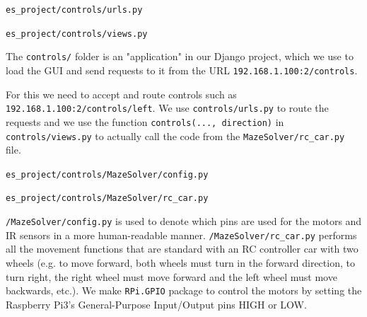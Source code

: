 \begin{description}[font=\quad $\circ$, topsep=6pt, itemsep=3em]
			
			
		\item \texttt{es\_project/controls/urls.py}
			
			
		\item \texttt{es\_project/controls/views.py}
			
			
			The \texttt{controls/} folder is an "application" in our Django project, which we use to load the GUI and send requests to it from the URL \texttt{192.168.1.100:2/controls}. 
			
			For this we need to accept and route controls such as \texttt{192.168.1.100:2/controls/left}. We use \texttt{controls/urls.py} to route the requests and we use the function \texttt{controls(..., direction)} in \texttt{controls/views.py} to actually call the code from the \texttt{MazeSolver/rc\_car.py} file.
			
		
		\item \texttt{es\_project/controls/MazeSolver/config.py}
			
		\clearpage			
		\item \texttt{es\_project/controls/MazeSolver/rc\_car.py}
			
			
			\texttt{/MazeSolver/config.py} is used to denote which pins are used for the motors and IR sensors in a more human-readable manner. \texttt{/MazeSolver/rc\_car.py} performs all the movement functions that are standard with an RC controller car with two wheels (e.g. to move forward, both wheels must turn in the forward direction, to turn right, the right wheel must move forward and the left wheel must move backwards, etc.). We make \texttt{RPi.GPIO} package to control the motors by setting the Raspberry Pi3's General-Purpose Input/Output pins HIGH or LOW.
			
		
	\end{description}

